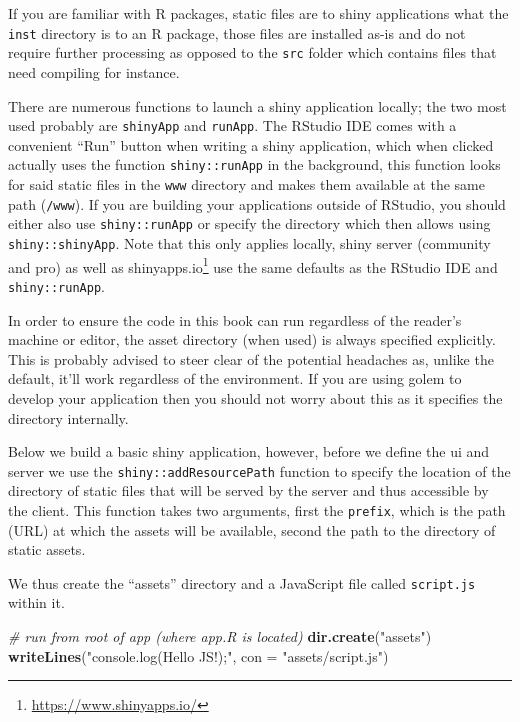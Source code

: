 \documentclass[
]{krantz}
\makeatletter
\newenvironment{Shaded}{\begin{snugshade}}{\end{snugshade}}
\newcommand{\CommentTok}[1]{\textcolor[rgb]{0.37,0.37,0.37}{\textit{#1}}}
\newcommand{\DataTypeTok}[1]{\textcolor[rgb]{0.27,0.27,0.27}{#1}}
\newcommand{\KeywordTok}[1]{\textcolor[rgb]{0.27,0.27,0.27}{\textbf{#1}}}
\newcommand{\NormalTok}[1]{#1}
\newcommand{\StringTok}[1]{\textcolor[rgb]{0.5,0.5,0.5}{#1}}
\renewcommand{\href}[2]{#2\footnote{\url{#1}}}
\newenvironment{kframe}{%
\medskip{}
\setlength{\fboxsep}{.8em}
 \def\at@end@of@kframe{}%
 \ifinner\ifhmode%
  \def\at@end@of@kframe{\end{minipage}}%
  \begin{minipage}{\columnwidth}%
 \fi\fi%
 \def\FrameCommand##1{\hskip\@totalleftmargin \hskip-\fboxsep
 \colorbox{shadecolor}{##1}\hskip-\fboxsep
     \hskip-\linewidth \hskip-\@totalleftmargin \hskip\columnwidth}%
 \MakeFramed {\advance\hsize-\width
   \@totalleftmargin\z@ \linewidth\hsize
   \@setminipage}}%
 {\par\unskip\endMakeFramed%
 \at@end@of@kframe}
\renewenvironment{Shaded}{\begin{kframe}}{\end{kframe}}
\makeatother
\begin{document}
If you are familiar with R packages, static files are to shiny applications what the \texttt{inst} directory is to an R package, those files are installed as-is and do not require further processing as opposed to the \texttt{src} folder which contains files that need compiling for instance.

There are numerous functions to launch a shiny application locally; the two most used probably are \texttt{shinyApp} and \texttt{runApp}. The RStudio IDE comes with a convenient ``Run'' button when writing a shiny application, which when clicked actually uses the function \texttt{shiny::runApp} in the background, this function looks for said static files in the \texttt{www} directory and makes them available at the same path (\texttt{/www}). If you are building your applications outside of RStudio, you should either also use \texttt{shiny::runApp} or specify the directory which then allows using \texttt{shiny::shinyApp}. Note that this only applies locally, shiny server (community and pro) as well as \href{https://www.shinyapps.io/}{shinyapps.io} use the same defaults as the RStudio IDE and \texttt{shiny::runApp}.

In order to ensure the code in this book can run regardless of the reader's machine or editor, the asset directory (when used) is always specified explicitly. This is probably advised to steer clear of the potential headaches as, unlike the default, it'll work regardless of the environment. If you are using golem \citep{R-golem} to develop your application then you should not worry about this as it specifies the directory internally.

Below we build a basic shiny application, however, before we define the ui and server we use the \texttt{shiny::addResourcePath} function to specify the location of the directory of static files that will be served by the server and thus accessible by the client. This function takes two arguments, first the \texttt{prefix}, which is the path (URL) at which the assets will be available, second the path to the directory of static assets.

We thus create the ``assets'' directory and a JavaScript file called \texttt{script.js} within it.

\begin{Shaded}
\begin{Highlighting}[]
\CommentTok{\# run from root of app (where app.R is located)}
\KeywordTok{dir.create}\NormalTok{(}\StringTok{"assets"}\NormalTok{)}
\KeywordTok{writeLines}\NormalTok{(}\StringTok{"console.log(\textquotesingle{}Hello JS!\textquotesingle{});"}\NormalTok{, }\DataTypeTok{con =} \StringTok{"assets/script.js"}\NormalTok{)}
\end{Highlighting}
\end{Shaded}
\end{document}
